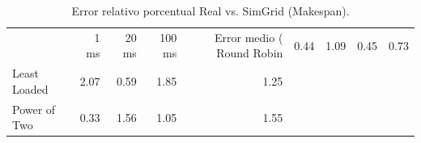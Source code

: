 \begin{table}
\caption{Error relativo porcentual Real vs. SimGrid (Makespan).}
\label{tab:validacion}
\begin{tabular}{lrrrr}
\toprule
 & 1 ms & 20 ms & 100 ms & Error medio (%
\midrule
Round Robin & 0.44 & 1.09 & 0.45 & 0.73 \\
Least Loaded & 2.07 & 0.59 & 1.85 & 1.25 \\
Power of Two & 0.33 & 1.56 & 1.05 & 1.55 \\
\bottomrule
\end{tabular}
\end{table}
